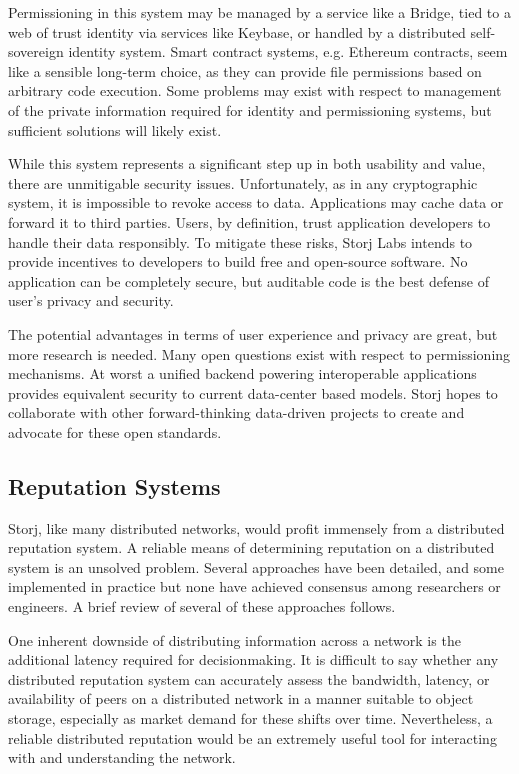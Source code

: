 \documentclass[a4paper,10pt]{article}
\begin{document}
Permissioning in this system may be managed by a service like a Bridge, tied to a web of trust identity via services like Keybase, or handled by a distributed self-sovereign identity system. Smart contract systems, e.g. Ethereum \cite{17} contracts, seem like a sensible long-term choice, as they can provide file permissions based on arbitrary code execution. Some problems may exist with respect to management of the private information required for identity and permissioning systems, but sufficient solutions will likely exist.

While this system represents a significant step up in both usability and value, there are unmitigable security issues. Unfortunately, as in any cryptographic system, it is impossible to revoke access to data. Applications may cache data or forward it to third parties. Users, by definition, trust application developers to handle their data responsibly. To mitigate these risks, Storj Labs intends to provide incentives to developers to build free and open-source software. No application can be completely secure, but auditable code is the best defense of user’s privacy and security.

The potential advantages in terms of user experience and privacy are great, but more research is needed. Many open questions exist with respect to permissioning mechanisms. At worst a unified backend powering interoperable applications provides equivalent security to current data-center based models. Storj hopes to collaborate with other forward-thinking data-driven projects to create and advocate for these open standards.

\subsection{Reputation Systems}
Storj, like many distributed networks, would profit immensely from a distributed reputation system. A reliable means of determining reputation on a distributed system is an unsolved problem. Several approaches have been detailed, and some implemented in practice but none have achieved consensus among researchers or engineers. A brief review of several of these approaches follows.

One inherent downside of distributing information across a network is the additional latency required for decisionmaking. It is difficult to say whether any distributed reputation system can accurately assess the bandwidth, latency, or availability of peers on a distributed network in a manner suitable to object storage, especially as market demand for these shifts over time. Nevertheless, a reliable distributed reputation would be an extremely useful tool for interacting with and understanding the network.
\end{document}
